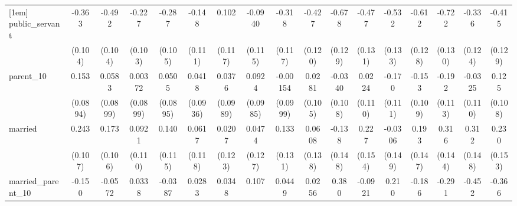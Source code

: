 {\begin{tabular}{l*{16}{c}}
[1em]
public\_servant      &      -0.363\sym{***}&      -0.492\sym{***}&      -0.227\sym{*}  &      -0.287\sym{**} &      -0.148         &       0.102         &     -0.0940         &      -0.318\sym{**} &      -0.427\sym{***}&      -0.678\sym{***}&      -0.477\sym{***}&      -0.532\sym{***}&      -0.612\sym{***}&      -0.722\sym{***}&      -0.336\sym{**} &      -0.415\sym{**} \\
                    &     (0.104)         &     (0.104)         &     (0.103)         &     (0.105)         &     (0.111)         &     (0.117)         &     (0.115)         &     (0.117)         &     (0.120)         &     (0.129)         &     (0.131)         &     (0.133)         &     (0.128)         &     (0.130)         &     (0.124)         &     (0.129)         \\
[1em]
parent\_10           &       0.153         &      0.0583         &     0.00372         &      0.0505         &      0.0418         &      0.0376         &      0.0924         &    -0.00154         &      0.0281         &     -0.0340         &      0.0224         &      -0.170         &      -0.153         &      -0.192         &     -0.0325         &       0.125         \\
                    &    (0.0894)         &    (0.0899)         &    (0.0899)         &    (0.0895)         &    (0.0936)         &    (0.0989)         &    (0.0985)         &    (0.0999)         &     (0.105)         &     (0.108)         &     (0.110)         &     (0.111)         &     (0.109)         &     (0.113)         &     (0.110)         &     (0.108)         \\
[1em]
married             &       0.243\sym{*}  &       0.173         &      0.0921         &       0.140         &      0.0617         &      0.0207         &      0.0474         &       0.133         &      0.0608         &      -0.138         &       0.227         &     -0.0306         &       0.193         &       0.316\sym{*}  &       0.312\sym{*}  &       0.230         \\
                    &     (0.107)         &     (0.106)         &     (0.110)         &     (0.115)         &     (0.118)         &     (0.123)         &     (0.127)         &     (0.131)         &     (0.138)         &     (0.148)         &     (0.154)         &     (0.149)         &     (0.147)         &     (0.144)         &     (0.148)         &     (0.153)         \\
[1em]
married\_parent\_10   &      -0.150         &     -0.0572         &      0.0338         &     -0.0387         &      0.0283         &      0.0348         &       0.107         &      0.0449         &      0.0256         &       0.380\sym{*}  &     -0.0921         &       0.210         &      -0.186         &      -0.291         &      -0.452\sym{*}  &      -0.366         \\

\end{tabular}}
